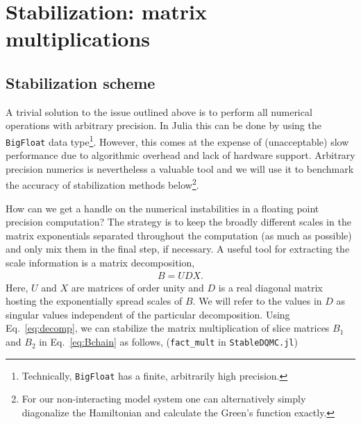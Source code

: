 \documentclass[submission, Phys]{SciPost}
\begin{document}

\section{\label{sec:stabilization}Stabilization: matrix multiplications}

\subsection{Stabilization scheme}
A trivial solution to the issue outlined above is to perform all numerical operations with arbitrary precision. In Julia this can be done by using the \texttt{BigFloat} data type\footnote{Technically, \texttt{BigFloat} has a finite, arbitrarily high precision.}. However, this comes at the expense of (unacceptable) slow performance due to algorithmic overhead and lack of hardware support. Arbitrary precision numerics is nevertheless a valuable tool and we will use it to benchmark the accuracy of stabilization methods below\footnote{For our non-interacting model system one can alternatively simply diagonalize the Hamiltonian and calculate the Green's function exactly.}.


How can we get a handle on the numerical instabilities in a floating point precision computation? The strategy is to keep the broadly different scales in the matrix exponentials separated throughout the computation (as much as possible) and only mix them in the final step, if necessary. A useful tool for extracting the scale information is a matrix decomposition,
\begin{align}
	B = UDX. \label{eq:decomp}
\end{align}
Here, $U$ and $X$ are matrices of order unity and $D$ is a real diagonal matrix hosting the exponentially spread scales of $B$. We will refer to the values in $D$ as singular values independent of the particular decomposition. Using Eq.~\eqref{eq:decomp}, we can stabilize the matrix multiplication of slice matrices $B_1$ and $B_2$ in Eq.~\eqref{eq:Bchain} as follows, (\texttt{fact\_mult} in \texttt{StableDQMC.jl})
\end{document}
